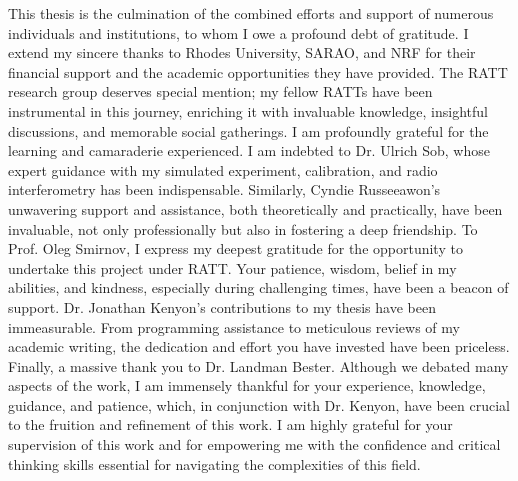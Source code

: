 \documentclass[
11pt, %
english, %
onehalfspacing, %
headsepline, %
]{MastersDoctoralThesis} %
\theoremstyle{customdefstyle}
\begin{document}

\begin{acknowledgements}
\addchaptertocentry{\acknowledgementname} %
    This thesis is the culmination of the combined efforts and support of numerous individuals and institutions, to whom I owe a profound debt of gratitude. I extend my sincere thanks to Rhodes University, \acrshort{SARAO}, and NRF for their financial support and the academic opportunities they have provided. The RATT research group deserves special mention; my fellow RATTs have been instrumental in this journey, enriching it with invaluable knowledge, insightful discussions, and memorable social gatherings. I am profoundly grateful for the learning and camaraderie experienced. I am indebted to Dr. Ulrich Sob, whose expert guidance with my simulated experiment, calibration, and radio interferometry has been indispensable. Similarly, Cyndie Russeeawon's unwavering support and assistance, both theoretically and practically, have been invaluable, not only professionally but also in fostering a deep friendship. To Prof. Oleg Smirnov, I express my deepest gratitude for the opportunity to undertake this project under RATT. Your patience, wisdom, belief in my abilities, and kindness, especially during challenging times, have been a beacon of support. Dr. Jonathan Kenyon's contributions to my thesis have been immeasurable. From programming assistance to meticulous reviews of my academic writing, the dedication and effort you have invested have been priceless. Finally, a massive thank you to Dr. Landman Bester. Although we debated many aspects of the work, I am immensely thankful for your experience, knowledge, guidance, and patience, which, in conjunction with Dr. Kenyon, have been crucial to the fruition and refinement of this work. I am highly grateful for your supervision of this work and for empowering me with the confidence and critical thinking skills essential for navigating the complexities of this field.


\end{acknowledgements}
\end{document}
